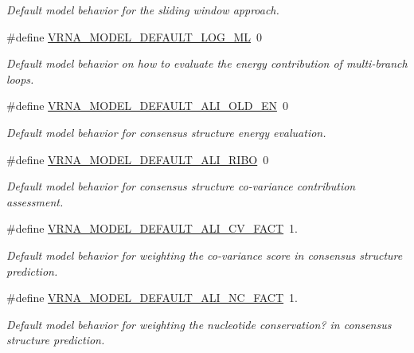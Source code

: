 \begin{DoxyCompactItemize}
\begin{DoxyCompactList}\small\item\em Default model behavior for the sliding window approach. \end{DoxyCompactList}\item 
\#define \mbox{\hyperlink{group__model__details_ga938f68463e84fe060aa6502f428a517d}{V\+R\+N\+A\+\_\+\+M\+O\+D\+E\+L\+\_\+\+D\+E\+F\+A\+U\+L\+T\+\_\+\+L\+O\+G\+\_\+\+ML}}~0
\begin{DoxyCompactList}\small\item\em Default model behavior on how to evaluate the energy contribution of multi-\/branch loops. \end{DoxyCompactList}\item 
\#define \mbox{\hyperlink{group__model__details_ga2a5bbfc1edf33077e39466d2d9807115}{V\+R\+N\+A\+\_\+\+M\+O\+D\+E\+L\+\_\+\+D\+E\+F\+A\+U\+L\+T\+\_\+\+A\+L\+I\+\_\+\+O\+L\+D\+\_\+\+EN}}~0
\begin{DoxyCompactList}\small\item\em Default model behavior for consensus structure energy evaluation. \end{DoxyCompactList}\item 
\#define \mbox{\hyperlink{group__model__details_ga64b3ab65a9ca42d4ad1d05e193083147}{V\+R\+N\+A\+\_\+\+M\+O\+D\+E\+L\+\_\+\+D\+E\+F\+A\+U\+L\+T\+\_\+\+A\+L\+I\+\_\+\+R\+I\+BO}}~0
\begin{DoxyCompactList}\small\item\em Default model behavior for consensus structure co-\/variance contribution assessment. \end{DoxyCompactList}\item 
\#define \mbox{\hyperlink{group__model__details_gaaaf3d73d6abc18d3889676952bfedb96}{V\+R\+N\+A\+\_\+\+M\+O\+D\+E\+L\+\_\+\+D\+E\+F\+A\+U\+L\+T\+\_\+\+A\+L\+I\+\_\+\+C\+V\+\_\+\+F\+A\+CT}}~1.
\begin{DoxyCompactList}\small\item\em Default model behavior for weighting the co-\/variance score in consensus structure prediction. \end{DoxyCompactList}\item 
\#define \mbox{\hyperlink{group__model__details_ga8f774daaafec28160c1ca5d09f2cbdba}{V\+R\+N\+A\+\_\+\+M\+O\+D\+E\+L\+\_\+\+D\+E\+F\+A\+U\+L\+T\+\_\+\+A\+L\+I\+\_\+\+N\+C\+\_\+\+F\+A\+CT}}~1.
\begin{DoxyCompactList}\small\item\em Default model behavior for weighting the nucleotide conservation? in consensus structure prediction. \end{DoxyCompactList}\item 

\end{DoxyCompactItemize}
